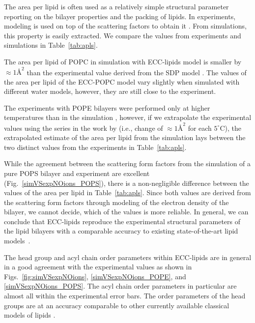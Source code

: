 The area per lipid is often used as a relatively simple structural parameter reporting on the bilayer properties and the packing of lipids. 
In experiments, modeling is used on top of the scattering factors to obtain it \citep{kucerka14}. 
From simulations, this property is easily extracted. 
We compare the values from experiments and simulations in Table~\ref{tab:apls}. 

The area per lipid of POPC in simulation with ECC-lipids model is smaller by $\approx 1Å^2$ 
than the experimental value derived from the SDP model \citep{kucerka14}. 
The values of the area per lipid of the ECC-POPC model vary slightly 
when simulated with different water models, however,
they are still close to the experiment. \citep{melcr18}


The experiments with POPE bilayers were performed only at higher temperatures than in the simulation \citep{parsegian89, rappolt03},
however, if we extrapolate the experimental values using the series in the work by \citet{rappolt03} 
(i.e., change of $\approx 1Å^2$ for each $5^\circ$C), 
the extrapolated estimate of the area per lipid from the simulation 
lays between the two distinct values from the experiments in Table~\ref{tab:apls}. 


While the agreement between the scattering form factors 
from the simulation of a pure POPS bilayer and experiment 
are excellent (Fig.~\ref{simVSexpNOions_POPS}),
there is a non-negligible difference between the values of the area per lipid in Table~\ref{tab:apls}. 
Since both values are derived from the scattering form factors through modeling of the electron density of the bilayer,
we cannot decide, which of the values is more reliable. 
In general, we can conclude that ECC-lipids
reproduce the experimental structural parameters of the lipid bilayers 
with a comparable accuracy to existing state-of-the-art lipid models~\citep{botan15, ollila16, Pluhackova2016}. 
 
The head group and acyl chain order parameters within ECC-lipids
are in general in a good agreement with the experimental values 
as shown in Figs.~\ref{fig:simVSexpNOions}, \ref{simVSexpNOions_POPE},  and \ref{simVSexpNOions_POPS}. 
The acyl chain order parameters in particular are almost all within the experimental error bars.
The order parameters of the head groups are at an accuracy comparable to 
other currently available classical models of lipids \citep{botan15, catte16, Pluhackova2016}. 

